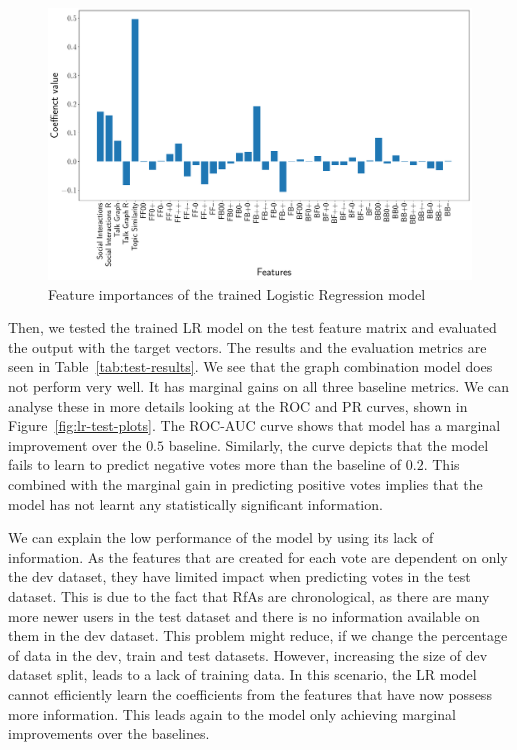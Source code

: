 \begin{figure}[htp]
    \centering
    \includegraphics[width=\textwidth]{images/Logistic Regression_features.pdf}
    \caption{Feature importances of the trained Logistic Regression model }
    \label{fig:lr-feature-importances}
\end{figure}


Then, we tested the trained LR model on the test feature matrix and evaluated the output with the target vectors.
The results and the evaluation metrics are seen in Table~\ref{tab:test-results}.
We see that the graph combination model does not perform very well.
It has marginal gains on all three baseline metrics.
We can analyse these in more details looking at the ROC and PR curves, shown in Figure~\ref{fig:lr-test-plots}.
The ROC-AUC curve shows that model has a marginal improvement over the $0.5$ baseline.
Similarly, the \negPR curve depicts that the model fails to learn to predict negative votes more than the baseline of $0.2$. 
This combined with the marginal gain in predicting positive votes implies that the model has not learnt any statistically significant information.

We can explain the low performance of the model by using its lack of information.
As the features that are created for each vote are dependent on only the dev dataset, they have limited impact when predicting votes in the test dataset.
This is due to the fact that RfAs are chronological, as there are many more newer users in the test dataset and there is no information available on them in the dev dataset.
This problem might reduce, if we change the percentage of data in the dev, train and test datasets.
However, increasing the size of dev dataset split, leads to a lack of training data.
In this scenario, the LR model cannot efficiently learn the coefficients from the features that have now possess more information.
This leads again to the model only achieving marginal improvements over the baselines.

